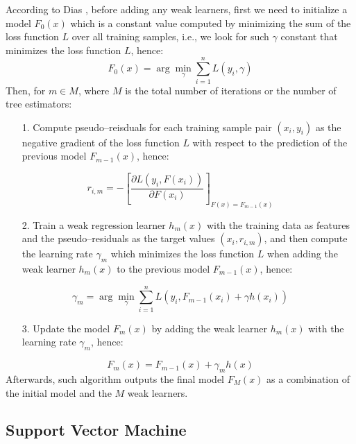 According to Dias \citep{dias2018comparison}, before adding any weak learners, first we need to initialize a model $F_0(x)$ which is a constant value computed by minimizing the sum of the loss function $L$ over all training samples, i.e., we look for such $\gamma$ constant that minimizes the loss function $L$, hence:
\begin{equation}
    F_{0}(x) = \arg \min _{\gamma} \sum_{i=1}^{n} L\left(y_{i}, \gamma\right)
\end{equation}
Then, for $m \in M$, where $M$ is the total number of iterations or the number of tree estimators:
\begin{itemize}\setlength\itemsep{0em}
    \item[1.] Compute pseudo--reisduals for each training sample pair $(x_i, y_i)$ as the negative gradient of the loss function $L$ with respect to the prediction of the previous model $F_{m-1}(x)$, hence:
\end{itemize}
\begin{equation}
    r_{i,m} = -\left[\frac{\partial L\left(y_{i}, F\left(x_{i}\right)\right)}{\partial F\left(x_{i}\right)}\right]_{F(x)=F_{m-1}(x)}
\end{equation}
\begin{itemize}\setlength\itemsep{0em}
    \item[2.] Train a weak regression learner $h_m(x)$ with the training data as features and the pseudo--residuals as the target values $(x_i, r_{i,m})$, and then compute the learning rate $\gamma_m$ which minimizes the loss function $L$ when adding the weak learner $h_m(x)$ to the previous model $F_{m-1}(x)$, hence:
\end{itemize}
\begin{equation}
    \gamma_{m} = \arg \min _{\gamma} \sum_{i=1}^{n} L\left(y_{i}, F_{m-1}\left(x_{i}\right)+\gamma h\left(x_{i}\right)\right)
\end{equation}
\begin{itemize}\setlength\itemsep{0em}
    \item[3.] Update the model $F_m(x)$ by adding the weak learner $h_m(x)$ with the learning rate $\gamma_m$, hence:
\end{itemize}
\begin{equation}
    F_m(x) = F_{m-1}(x) + \gamma_m h(x)
\end{equation}
Afterwards, such algorithm outputs the final model $F_M(x)$ as a combination of the initial model and the $M$ weak learners.

\subsection{Support Vector Machine}

